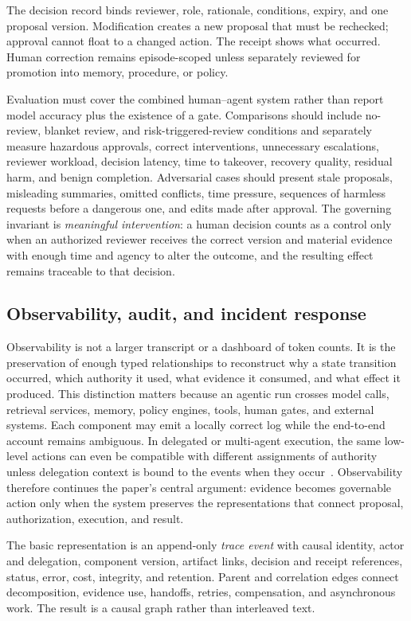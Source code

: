 The decision record binds reviewer, role, rationale, conditions, expiry, and one proposal version. Modification creates a new proposal that must be rechecked; approval cannot float to a changed action. The receipt shows what occurred. Human correction remains episode-scoped unless separately reviewed for promotion into memory, procedure, or policy.

Evaluation must cover the combined human--agent system rather than report model accuracy plus the existence of a gate. Comparisons should include no-review, blanket review, and risk-triggered-review conditions and separately measure hazardous approvals, correct interventions, unnecessary escalations, reviewer workload, decision latency, time to takeover, recovery quality, residual harm, and benign completion. Adversarial cases should present stale proposals, misleading summaries, omitted conflicts, time pressure, sequences of harmless requests before a dangerous one, and edits made after approval. The governing invariant is \emph{meaningful intervention}: a human decision counts as a control only when an authorized reviewer receives the correct version and material evidence with enough time and agency to alter the outcome, and the resulting effect remains traceable to that decision.

\subsection{Observability, audit, and incident response}

Observability is not a larger transcript or a dashboard of token counts. It is the preservation of enough typed relationships to reconstruct why a state transition occurred, which authority it used, what evidence it consumed, and what effect it produced. This distinction matters because an agentic run crosses model calls, retrieval services, memory, policy engines, tools, human gates, and external systems. Each component may emit a locally correct log while the end-to-end account remains ambiguous. In delegated or multi-agent execution, the same low-level actions can even be compatible with different assignments of authority unless delegation context is bound to the events when they occur~\cite{mishra2026delegatedobservability}. Observability therefore continues the paper's central argument: evidence becomes governable action only when the system preserves the representations that connect proposal, authorization, execution, and result.

The basic representation is an append-only \emph{trace event} with causal identity, actor and delegation, component version, artifact links, decision and receipt references, status, error, cost, integrity, and retention. Parent and correlation edges connect decomposition, evidence use, handoffs, retries, compensation, and asynchronous work. The result is a causal graph rather than interleaved text.

